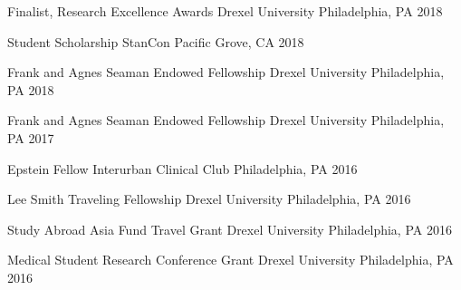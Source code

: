 



\begin{cvhonors}

  \cvhonor
    {Finalist, Research Excellence Awards} %
    {Drexel University} %
    {Philadelphia, PA} %
    {2018} %

  \cvhonor
    {Student Scholarship} %
    {StanCon} %
    {Pacific Grove, CA} %
    {2018} %

  \cvhonor
    {Frank and Agnes Seaman Endowed Fellowship} %
    {Drexel University} %
    {Philadelphia, PA} %
    {2018} %

  \cvhonor
    {Frank and Agnes Seaman Endowed Fellowship} %
    {Drexel University} %
    {Philadelphia, PA} %
    {2017} %

  \cvhonor
    {Epstein Fellow} %
    {Interurban Clinical Club} %
    {Philadelphia, PA} %
    {2016} %
    

  \cvhonor
    {Lee Smith Traveling Fellowship} %
    {Drexel University} %
    {Philadelphia, PA} %
    {2016} %
    

  \cvhonor
    {Study Abroad Asia Fund Travel Grant} %
    {Drexel University} %
    {Philadelphia, PA} %
    {2016} %
    
  \cvhonor
    {Medical Student Research Conference Grant} %
    {Drexel University} %
    {Philadelphia, PA} %
    {2016} %
    

\end{cvhonors}
